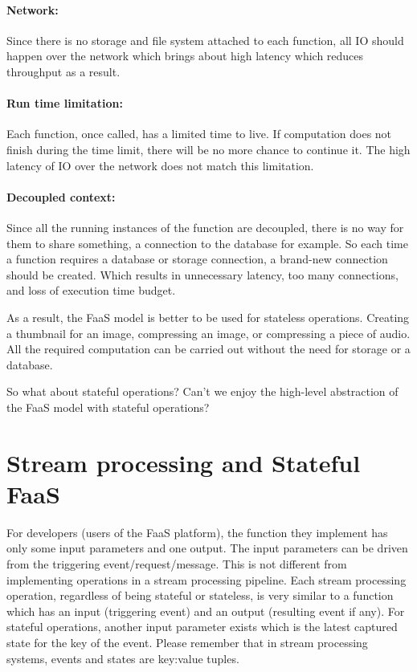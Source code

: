 \documentclass[a4]{report}
\begin{document}
    \paragraph{Network:} Since there is no storage and file system attached to each function, all IO should happen over the network which brings about high latency which reduces throughput as a result.

    \paragraph{Run time limitation:} Each function, once called, has a limited time to live.
    If computation does not finish during the time limit, there will be no more chance to continue it.
    The high latency of IO over the network does not match this limitation.

    \paragraph{Decoupled context:} Since all the running instances of the function are decoupled, there is
    no way for them to share something, a connection to the database for example.
    So each time a function requires a database or storage connection, a brand-new connection should be created.
    Which results in unnecessary latency, too many connections, and loss of execution time budget.

    As a result, the FaaS model is better to be used for stateless operations.
    Creating a thumbnail for an image, compressing an image, or compressing a piece of audio.
    All the required computation can be carried out without the need for storage or a database.

    So what about stateful operations?
    Can't we enjoy the high-level abstraction of the FaaS model with stateful operations?


    \section{Stream processing and Stateful FaaS}
    For developers (users of the FaaS platform), the function they implement has only some input parameters and one output.
    The input parameters can be driven from the triggering event/request/message.
    This is not different from implementing operations in a stream processing pipeline.
    Each stream processing operation, regardless of being stateful or stateless, is very similar to a function which has an input (triggering event) and an output (resulting event if any).
    For stateful operations, another input parameter exists which is the latest captured state for the key of the event.
    Please remember that in stream processing systems, events and states are key:value tuples.
\end{document}
